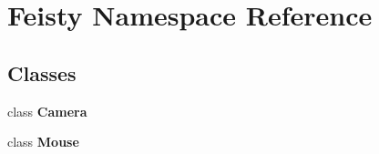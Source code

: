 \section{Feisty Namespace Reference}
\label{namespace_feisty}
\subsection*{Classes}
\begin{DoxyCompactItemize}
\item 
class {\bf Camera}
\item 
class {\bf Mouse}
\end{DoxyCompactItemize}
